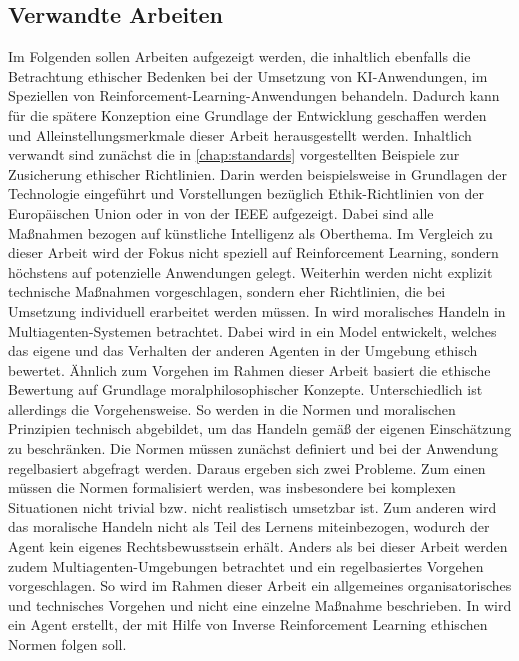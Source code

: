 \subsection{Verwandte Arbeiten}
Im Folgenden sollen Arbeiten aufgezeigt werden, die inhaltlich ebenfalls die Betrachtung ethischer Bedenken bei der Umsetzung von KI-Anwendungen, im Speziellen von Reinforcement-Learning-Anwendungen behandeln.
Dadurch kann für die spätere Konzeption eine Grundlage der Entwicklung geschaffen werden und Alleinstellungsmerkmale dieser Arbeit herausgestellt werden.
\ab 
Inhaltlich verwandt sind zunächst die in \autoref{chap:standards} vorgestellten Beispiele zur Zusicherung ethischer Richtlinien.
Darin werden beispielsweise in \cite{smuha} Grundlagen der Technologie eingeführt und Vorstellungen bezüglich Ethik-Richtlinien von der Europäischen Union oder in \cite{chatila2019} von der IEEE aufgezeigt.
Dabei sind alle Maßnahmen bezogen auf künstliche Intelligenz als Oberthema.
Im Vergleich zu dieser Arbeit wird der Fokus nicht speziell auf Reinforcement Learning, sondern höchstens auf potenzielle Anwendungen gelegt.
Weiterhin werden nicht explizit technische Maßnahmen vorgeschlagen, sondern eher Richtlinien, die bei Umsetzung individuell erarbeitet werden müssen.
\ab 
In \cite{cointe} wird moralisches Handeln in Multiagenten-Systemen betrachtet.
Dabei wird in \cite{cointe} ein Model entwickelt, welches das eigene und das Verhalten der anderen Agenten in der Umgebung ethisch bewertet.
Ähnlich zum Vorgehen im Rahmen dieser Arbeit basiert die ethische Bewertung auf Grundlage moralphilosophischer Konzepte.
Unterschiedlich ist allerdings die Vorgehensweise.
So werden in \cite{cointe} die Normen und moralischen Prinzipien technisch abgebildet, um das Handeln gemäß der eigenen Einschätzung zu beschränken.
Die Normen müssen zunächst definiert und bei der Anwendung regelbasiert abgefragt werden.
Daraus ergeben sich zwei Probleme.
Zum einen müssen die Normen formalisiert werden, was insbesondere bei komplexen Situationen nicht trivial bzw. nicht realistisch umsetzbar ist.
Zum anderen wird das moralische Handeln nicht als Teil des Lernens miteinbezogen, wodurch der Agent kein eigenes Rechtsbewusstsein erhält.
Anders als bei dieser Arbeit werden zudem Multiagenten-Umgebungen betrachtet und ein regelbasiertes Vorgehen vorgeschlagen.
So wird im Rahmen dieser Arbeit ein allgemeines organisatorisches und technisches Vorgehen und nicht eine einzelne Maßnahme beschrieben.
\ab 
In \cite{noothigattu} wird ein Agent erstellt, der mit Hilfe von Inverse Reinforcement Learning ethischen Normen folgen soll.
